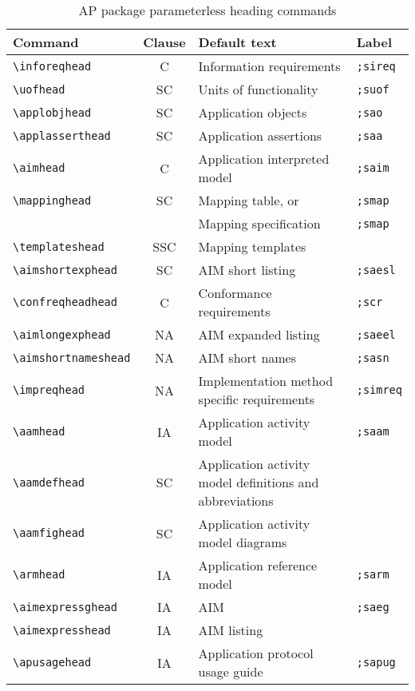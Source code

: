 \documentclass[wd,copyright,letterpaper]{isov2}
\newlength{\prwlen}
\begin{document}
{{{\settowidth{\prwlen}{\quad Application activity model definitions}
\begin{table}
\centering
\caption{AP package parameterless heading commands}
\label{tab:apnpheads}
\begin{tabular}{|l|c|p{\prwlen}|l|} \hline
\textbf{Command} & \textbf{Clause} & \textbf{Default text} & \textbf{Label} \\ \hline
\verb|\inforeqhead| & C & Information requirements & \verb|;sireq| \\
\verb|\uofhead| & SC & Units of functionality  & \verb|;suof| \\
\verb|\applobjhead| & SC & Application objects  & \verb|;sao| \\
\verb|\applasserthead| & SC & Application assertions  & \verb|;saa| \\
\verb|\aimhead| & C & Application interpreted model & \verb|;saim| \\
\verb|\mappinghead| & SC & Mapping table, or & \verb|;smap| \\
                    &    & Mapping specification  & \verb|;smap| \\
\verb|\templateshead| & SSC & Mapping templates &    \\
\verb|\aimshortexphead| & SC & AIM \Express{} short listing & \verb|;saesl| \\
\verb|\confreqheadhead| & C & Conformance requirements & \verb|;scr| \\
\verb|\aimlongexphead| & NA & AIM \Express{} expanded listing  & \verb|;saeel| \\
\verb|\aimshortnameshead| & NA & AIM short names  & \verb|;sasn| \\
\verb|\impreqhead| & NA & Implementation method specific requirements & \verb|;simreq| \\
\verb|\aamhead| & IA & Application activity model & \verb|;saam| \\
\verb|\aamdefhead| & SC & Application activity model definitions and abbreviations & \verb|| \\
\verb|\aamfighead| & SC & Application activity model diagrams & \verb|| \\
\verb|\armhead| & IA & Application reference model & \verb|;sarm| \\
\verb|\aimexpressghead| & IA & AIM \ExpressG{} & \verb|;saeg| \\
\verb|\aimexpresshead| & IA & AIM \Express{} listing & \verb|| \\
\verb|\apusagehead| & IA & Application protocol usage guide & \verb|;sapug| \\
 \hline
\end{tabular}
\end{table}

}}}
\end{document}
